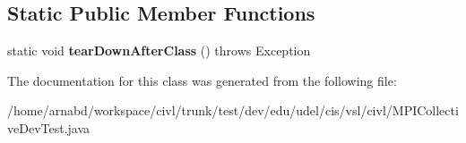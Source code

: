 \subsection*{Static Public Member Functions}
\begin{DoxyCompactItemize}
\item 
\hypertarget{classedu_1_1udel_1_1cis_1_1vsl_1_1civl_1_1MPICollectiveDevTest_ad507d5e1f23ed3a1979757a05ce4847f}{}static void {\bfseries tear\+Down\+After\+Class} ()  throws Exception \label{classedu_1_1udel_1_1cis_1_1vsl_1_1civl_1_1MPICollectiveDevTest_ad507d5e1f23ed3a1979757a05ce4847f}

\end{DoxyCompactItemize}


The documentation for this class was generated from the following file\+:\begin{DoxyCompactItemize}
\item 
/home/arnabd/workspace/civl/trunk/test/dev/edu/udel/cis/vsl/civl/M\+P\+I\+Collective\+Dev\+Test.\+java\end{DoxyCompactItemize}
